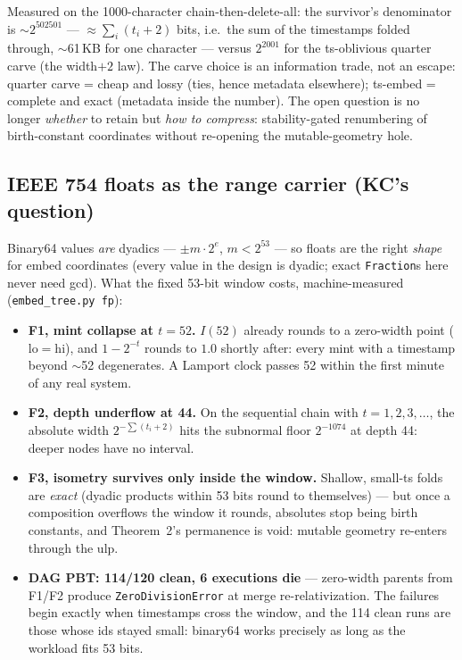 \documentclass[11pt]{article}
\begin{document}
\medskip
\noindent Measured on the 1000-character chain-then-delete-all: the
survivor's denominator is $\sim 2^{502501}$ --- $\approx
\sum_i (t_i + 2)$ bits, i.e.\ the sum of the timestamps folded through,
$\sim$61\,KB for one character --- versus $2^{2001}$ for the
ts-oblivious quarter carve (the width$+2$ law). The carve choice is an
information trade, not an escape: quarter carve = cheap and lossy
(ties, hence metadata elsewhere); ts-embed = complete and exact
(metadata inside the number). The open question is no longer
\emph{whether} to retain but \emph{how to compress}: stability-gated
renumbering of birth-constant coordinates without re-opening the
mutable-geometry hole.

\subsection*{IEEE 754 floats as the range carrier (KC's question)}

Binary64 values \emph{are} dyadics --- $\pm m \cdot 2^{e}$, $m <
2^{53}$ --- so floats are the right \emph{shape} for embed coordinates
(every value in the design is dyadic; exact \texttt{Fraction}s here
never need gcd). What the fixed 53-bit window costs, machine-measured
(\texttt{embed\_tree.py fp}):

\begin{itemize}
\item \textbf{F1, mint collapse at $t = 52$.} $I(52)$ already rounds to
a zero-width point ($\mathrm{lo} = \mathrm{hi}$), and $1 - 2^{-t}$
rounds to $1.0$ shortly after: every mint with a timestamp beyond
$\sim$52 degenerates. A Lamport clock passes 52 within the first minute
of any real system.
\item \textbf{F2, depth underflow at 44.} On the sequential chain with
$t = 1, 2, 3, \ldots$, the absolute width $2^{-\sum (t_i+2)}$ hits the
subnormal floor $2^{-1074}$ at depth 44: deeper nodes have no interval.
\item \textbf{F3, isometry survives only inside the window.} Shallow,
small-ts folds are \emph{exact} (dyadic products within 53 bits round
to themselves) --- but once a composition overflows the window it
rounds, absolutes stop being birth constants, and Theorem~2's
permanence is void: mutable geometry re-enters through the ulp.
\item \textbf{DAG PBT: 114/120 clean, 6 executions die} ---
zero-width parents from F1/F2 produce \texttt{ZeroDivisionError} at
merge re-relativization. The failures begin exactly when timestamps
cross the window, and the 114 clean runs are those whose ids stayed
small: binary64 works precisely as long as the workload fits 53 bits.
\end{itemize}
\end{document}
